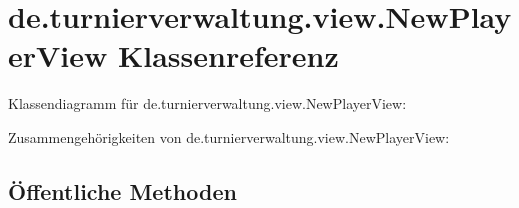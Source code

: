 \hypertarget{classde_1_1turnierverwaltung_1_1view_1_1_new_player_view}{}\section{de.\+turnierverwaltung.\+view.\+New\+Player\+View Klassenreferenz}
\label{classde_1_1turnierverwaltung_1_1view_1_1_new_player_view}


Klassendiagramm für de.\+turnierverwaltung.\+view.\+New\+Player\+View\+:


Zusammengehörigkeiten von de.\+turnierverwaltung.\+view.\+New\+Player\+View\+:
\subsection*{Öffentliche Methoden}
